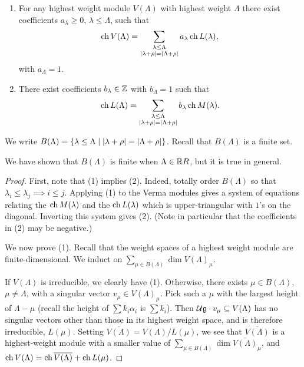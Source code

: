 \begin{lemma}\leavevmode
\begin{enumerate}
  \item For any highest weight module $V(\Lambda)$ with highest weight
    $\Lambda$ there exist coefficients $a_\lambda \geq 0$, $\lambda \leq \Lambda$,
    such that
    \[
      \operatorname{ch} V(\Lambda) = \sum_{\substack{\lambda \leq \Lambda\\ |\lambda + \rho| = |\Lambda + \rho|}} a_\lambda \operatorname{ch} L(\lambda),
    \]
    with $a_\Lambda = 1$.
  \item There exist coefficients $b_\lambda \in \mathbb{Z}$ with $b_\Lambda = 1$ such
    that
    \[
      \operatorname{ch} L(\Lambda) = \sum_{\substack{\lambda \leq \Lambda\\ |\lambda + \rho| = |\Lambda + \rho|}} b_\lambda \operatorname{ch} M(\lambda).
    \]
\end{enumerate}
\end{lemma}

We write
$B(\Lambda) = \{\lambda \leq \Lambda \mid |\lambda + \rho| = |\Lambda + \rho|\}$.
Recall that $B(\Lambda)$ is a finite set.

\begin{remark}
We have shown that $B(\Lambda)$ is finite when $\Lambda \in \mathbb{R} R$, but it is
true in general.
\end{remark}

\begin{proof}
First, note that (1) implies (2). Indeed, totally order $B(\Lambda)$ so that
$\lambda_i \leq \lambda_j \implies i \leq j$. Applying (1) to the Verma
modules gives a system of equations relating the $\operatorname{ch} M(\lambda)$ and the
$\operatorname{ch} L(\lambda)$ which is upper-triangular with $1$'s on the diagonal.
Inverting this system gives (2). (Note in particular that the coefficients in
(2) may be negative.)

We now prove (1). Recall that the weight spaces of a highest weight module are
finite-dimensional. We induct on $\sum_{\mu \in B(\Lambda)} \dim V(\Lambda)_\mu$.

If $V(\Lambda)$ is irreducible, we clearly have (1). Otherwise, there exists
$\mu \in B(\Lambda)$, $\mu \neq \Lambda$, with a singular vector
$v_\mu \in V(\Lambda)_\mu$. Pick such a $\mu$ with the largest height of
$\Lambda - \mu$ (recall the height of $\sum k_i\alpha_i$ is $\sum k_i$). Then
$\mathcal{U}\mathfrak{g} \cdot v_\mu \subseteq V(\Lambda)$ has no singular vectors other than
those in its highest weight space, and is therefore irreducible, $L(\mu)$.
Setting $\overline{V(\Lambda)} = V(\Lambda)/L(\mu)$, we see that
$\overline{V(\Lambda)}$ is a highest-weight module with a smaller value of
$\sum_{\mu \in B(\Lambda)} \dim \overline{V(\Lambda)}_\mu$, and
$\operatorname{ch} V(\Lambda) = \operatorname{ch} \overline{V(\Lambda)} + \operatorname{ch} L(\mu)$.
\end{proof}

